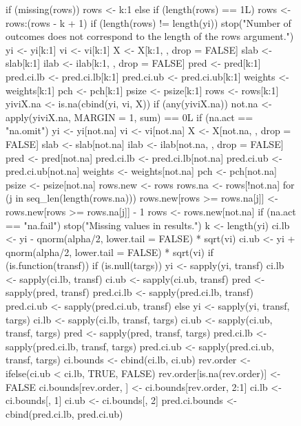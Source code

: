 \documentclass[11pt, a4paper]{article}
\begin{document}
\begin{figure}
{\begin{Schunk}
\begin{Soutput}
{    if (missing(rows)) {
        rows <- k:1
    }
    else {
        if (length(rows) == 1L) {
            rows <- rows:(rows - k + 1)
        }
    }
    if (length(rows) != length(yi)) 
        stop("Number of outcomes does not correspond to the length of the rows argument.")
    yi <- yi[k:1]
    vi <- vi[k:1]
    X <- X[k:1, , drop = FALSE]
    slab <- slab[k:1]
    ilab <- ilab[k:1, , drop = FALSE]
    pred <- pred[k:1]
    pred.ci.lb <- pred.ci.lb[k:1]
    pred.ci.ub <- pred.ci.ub[k:1]
    weights <- weights[k:1]
    pch <- pch[k:1]
    psize <- psize[k:1]
    rows <- rows[k:1]
    yiviX.na <- is.na(cbind(yi, vi, X))
    if (any(yiviX.na)) {
        not.na <- apply(yiviX.na, MARGIN = 1, sum) == 0L
        if (na.act == "na.omit") {
            yi <- yi[not.na]
            vi <- vi[not.na]
            X <- X[not.na, , drop = FALSE]
            slab <- slab[not.na]
            ilab <- ilab[not.na, , drop = FALSE]
            pred <- pred[not.na]
            pred.ci.lb <- pred.ci.lb[not.na]
            pred.ci.ub <- pred.ci.ub[not.na]
            weights <- weights[not.na]
            pch <- pch[not.na]
            psize <- psize[not.na]
            rows.new <- rows
            rows.na <- rows[!not.na]
            for (j in seq_len(length(rows.na))) {
                rows.new[rows >= rows.na[j]] <- rows.new[rows >= 
                  rows.na[j]] - 1
            }
            rows <- rows.new[not.na]
        }
        if (na.act == "na.fail") 
            stop("Missing values in results.")
    }
    k <- length(yi)
    ci.lb <- yi - qnorm(alpha/2, lower.tail = FALSE) * sqrt(vi)
    ci.ub <- yi + qnorm(alpha/2, lower.tail = FALSE) * sqrt(vi)
    if (is.function(transf)) {
        if (is.null(targs)) {
            yi <- sapply(yi, transf)
            ci.lb <- sapply(ci.lb, transf)
            ci.ub <- sapply(ci.ub, transf)
            pred <- sapply(pred, transf)
            pred.ci.lb <- sapply(pred.ci.lb, transf)
            pred.ci.ub <- sapply(pred.ci.ub, transf)
        }
        else {
            yi <- sapply(yi, transf, targs)
            ci.lb <- sapply(ci.lb, transf, targs)
            ci.ub <- sapply(ci.ub, transf, targs)
            pred <- sapply(pred, transf, targs)
            pred.ci.lb <- sapply(pred.ci.lb, transf, targs)
            pred.ci.ub <- sapply(pred.ci.ub, transf, targs)
        }
    }
    ci.bounds <- cbind(ci.lb, ci.ub)
    rev.order <- ifelse(ci.ub < ci.lb, TRUE, FALSE)
    rev.order[is.na(rev.order)] <- FALSE
    ci.bounds[rev.order, ] <- ci.bounds[rev.order, 2:1]
    ci.lb <- ci.bounds[, 1]
    ci.ub <- ci.bounds[, 2]
    pred.ci.bounds <- cbind(pred.ci.lb, pred.ci.ub)
}
\end{Soutput}
\end{Schunk}}
\end{figure}
\end{document}
